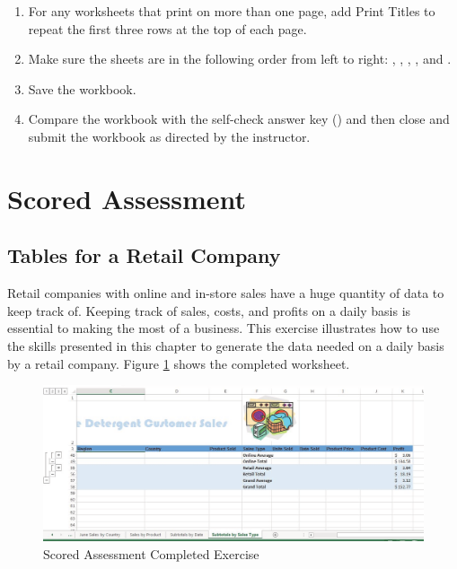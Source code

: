 \begin{enumerate}
	\item For any worksheets that print on more than one page, add Print Titles to repeat the first three rows at the top of each page.
	\item Make sure the sheets are in the following order from left to right: , , , , and .
	\item Save the  workbook.
	\item Compare the workbook with the self-check answer key () and then close and submit the  workbook as directed by the instructor.

\end{enumerate}

\section{Scored Assessment}

\subsection{Tables for a Retail Company}

Retail companies with online and in-store sales have a huge quantity of data to keep track of. Keeping track of sales, costs, and profits on a daily basis is essential to making the most of a business. This exercise illustrates how to use the skills presented in this chapter to generate the data needed on a daily basis by a retail company. Figure \ref{05:fig31} shows the completed worksheet.

\begin{figure}[H]
	\centering
	\includegraphics[width=\maxwidth{.95\linewidth}]{gfx/ch05_fig31}
	\caption{Scored Assessment Completed Exercise}
	\label{05:fig31}
\end{figure}

